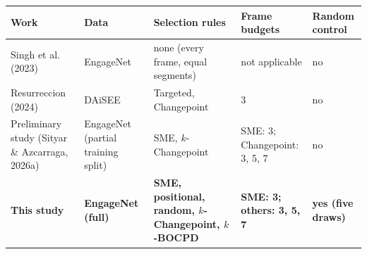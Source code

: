 \documentclass[12pt,border=10pt]{standalone}
\begin{document}
\renewcommand{\arraystretch}{1.35}
\begin{tabular}{@{}L{3.6cm}L{3.3cm}L{4.4cm}L{3.3cm}L{2.2cm}@{}}
   \toprule
   Work & Data & Selection rules & Frame budgets & Random control \\
   \midrule
   Singh et al. (2023) & EngageNet & none (every frame, equal segments) & not applicable & no \\
   Resurreccion (2024) & DAiSEE & Targeted, Changepoint & 3 & no \\
   Preliminary study (Sityar \& Azcarraga, 2026a) & EngageNet (partial training split) & SME, $k$-Changepoint & SME: 3; Changepoint: 3, 5, 7 & no \\
   \textbf{This study} & \textbf{EngageNet (full)} & \textbf{SME, positional, random, $k$-Changepoint, $k$-BOCPD} & \textbf{SME: 3; others: 3, 5, 7} & \textbf{yes (five draws)} \\
   \bottomrule
\end{tabular}
\end{document}
